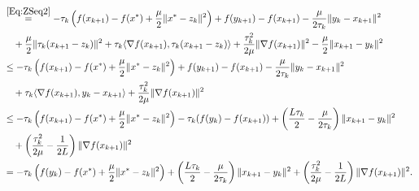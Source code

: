 \documentclass[11pt]{article}
\theoremstyle{plain}
\begin{document}
\begin{subequations}
\begin{align*}
&\overset{\eqref{Eq:ZSeq2}}{=} -\tau_k\left( f(x_{k+1} ) - f(x^\ast) + \frac{\mu}{2}\|x^\ast - z_k\|^2 \right) + f(y_{k+1}) - f(x_{k+1})   - \frac{\mu}{2\tau_k}\|y_k - x_{k+1}\|^2  \\
&\quad   + \frac{\mu}{2}\|\tau_k(x_{k+1} - z_k)\|^2 + \tau_k \langle \nabla f(x_{k+1}), \tau_k(x_{k+1} - z_k)\rangle + \frac{\tau_k^2}{2\mu}\|\nabla f(x_{k+1})\|^2  - \frac{\mu}{2} \|x_{k+1} - y_{k}\|^2 \\
&\leq -\tau_k\left( f(x_{k+1} ) - f(x^\ast) + \frac{\mu}{2}\|x^\ast - z_k\|^2 \right) + f(y_{k+1}) - f(x_{k+1})   - \frac{\mu}{2\tau_k}\|y_k - x_{k+1}\|^2      \\
&\quad  + \tau_k \langle \nabla f(x_{k+1}), y_k - x_{k+1}\rangle + \frac{\tau_k^2}{2\mu}\|\nabla f(x_{k+1})\|^2  \\
&\leq -\tau_k\left( f(x_{k+1} ) - f(x^\ast) + \frac{\mu}{2}\|x^\ast - z_k\|^2 \right)  -\tau_k( f(y_k) - f(x_{k+1})) + \left( \frac{L\tau_k}{2}- \frac{\mu}{2\tau_k}\right)\|x_{k+1} - y_k\|^2  \\
&\quad + \left(\frac{\tau_k^2}{2\mu}-\frac{1}{2L}\right)\|\nabla f(x_{k+1})\|^2   \\
&=-\tau_k\left( f(y_k) - f(x^\ast) + \frac{\mu}{2}\|x^\ast - z_k\|^2 \right) + \left( \frac{L\tau_k}{2}- \frac{\mu}{2\tau_k}\right)\|x_{k+1} - y_k\|^2  + \left(\frac{\tau_k^2}{2\mu}-\frac{1}{2L}\right)\|\nabla f(x_{k+1})\|^2.   

\end{align*}
\end{subequations}
\end{document}
